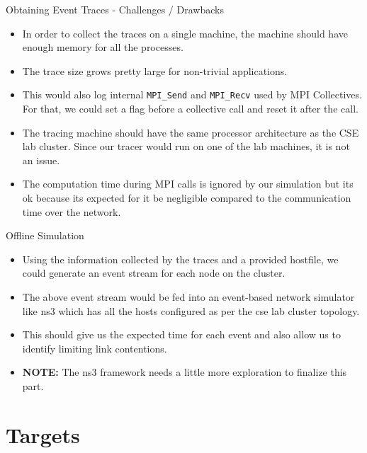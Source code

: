 \documentclass[pdf]{beamer}
\begin{document}
\begin{frame}{Obtaining Event Traces - Challenges / Drawbacks}
  \begin{itemize}
    \item<1-> In order to collect the traces on a single machine, the machine
      should have enough memory for all the processes.
    \item<2-> The trace size grows pretty large for non-trivial applications.
    \item<3-> This would also log internal \texttt{MPI\_Send} and
      \texttt{MPI\_Recv} used by MPI Collectives. For that, we could set a flag
      before a collective call and reset it after the call.
    \item<4-> The tracing machine should have the same processor architecture
      as the CSE lab cluster. Since our tracer would run on one of the lab
      machines, it is not an issue.
    \item<5-> The computation time during MPI calls is ignored by our simulation
      but its ok because its expected for it be negligible compared to the
      communication time over the network.
  \end{itemize}
\end{frame}
\begin{frame}{Offline Simulation}
  \begin{itemize}
    \item<1-> Using the information collected by the traces and a provided
      hostfile, we could generate an event stream for each node on the cluster.
    \item<2-> The above event stream would be fed into an event-based network
      simulator like ns3 which has all the hosts configured as per the cse lab
      cluster topology.
    \item<3-> This should give us the expected time for each event and also
      allow us to identify limiting link contentions.
    \item<4-> \textbf{NOTE:} The ns3 framework needs a little more exploration
      to finalize this part.
  \end{itemize}
\end{frame}
\section{Targets}
\end{document}
